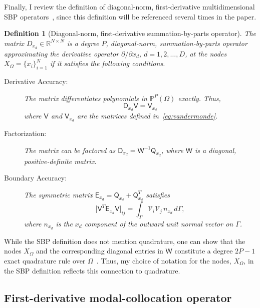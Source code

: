 \documentclass[pdflatex,sn-mathphys-num]{sn-jnl}%
\theoremstyle{thmstyleone}%
\theoremstyle{thmstyletwo}%
\theoremstyle{thmstylethree}%
\newtheorem{definition}{Definition}%
\newcommand{\mat}[1]{\ensuremath{\mathsf{#1}}}
\newcommand{\fnc}[1]{\ensuremath{\mathcal{#1}}}
\begin{document}
Finally, I review the definition of diagonal-norm, first-derivative multidimensional SBP operators~\cite{Hicken2016multidimensional}, since this definition will be referenced several times in the paper.

\begin{definition}[Diagonal-norm, first-derivative summation-by-parts operator]\label{def:sbp}
The matrix $D_{x_d} \in \mathbb{R}^{N\times N}$ is a degree $P$, diagonal-norm, summation-by-parts operator approximating the derivative operator $\partial/\partial x_d$, $d=1,2,\ldots,D$, at the nodes $X_{\Omega} = \{x_{i}\}_{i=1}^{N}$ if it satisfies the following conditions.
\begin{description}
    \item[Derivative Accuracy:] The matrix differentiates polynomials in $\mathbb{P}^P(\Omega)$ exactly.  Thus,
    \begin{equation}\label{eq:sbp_accuracy}
        \mat{D}_{x_d} \mat{V} = \mat{V}_{x_d}
    \end{equation}
    where $\mat{V}$ and $\mat{V}_{x_d}$ are the matrices defined in~\eqref{eq:vandermonde}.
    \item[Factorization:] The matrix can be factored as $\mat{D}_{x_d} = \mat{W}^{-1} \mat{Q}_{x_d}$, where $\mat{W}$ is a diagonal, positive-definite matrix.
    \item[Boundary Accuracy:] The symmetric matrix $\mat{E}_{x_d} = \mat{Q}_{x_d} + \mat{Q}_{x_d}^{T}$ satisfies
    \begin{equation}\label{eq:sbp_boundary}
    \big[ \mat{V}^T \mat{E}_{x_d} \mat{V} \big]_{ij} = \int_{\Gamma} \fnc{V}_i \fnc{V}_j \, n_{x_d}\, d\Gamma,
    \end{equation}
    where $n_{x_d}$ is the $x_{d}$ component of the outward unit normal vector on $\Gamma$.
\end{description}
\end{definition}

While the SBP definition does not mention quadrature, one can show that the nodes $X_{\Omega}$ and the corresponding diagonal entries in $\mat{W}$ constitute a degree $2P-1$ exact quadrature rule over $\Omega$~\cite{Hicken2013quad,Hicken2016multidimensional}.  Thus, my choice of notation for the nodes, $X_{\Omega}$, in the SBP definition reflects this connection to quadrature.

\subsection{First-derivative modal-collocation operator}
\end{document}
